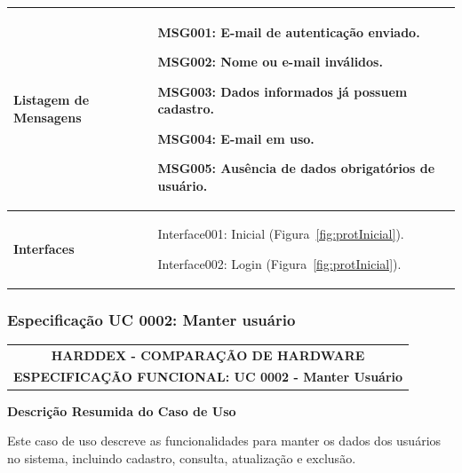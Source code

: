 \begin{quadro}[!htbp]
\begin{tabular}{  m{4cm}  m{11cm} }
        \textbf {Listagem de Mensagens}   & MSG001: E-mail de autenticação enviado.
        
        MSG002: Nome ou e-mail inválidos.

        MSG003: Dados informados já possuem cadastro.

        MSG004: E-mail em uso.
          
        MSG005: Ausência de dados obrigatórios de usuário.  \\ \hline
        
        \cellcolor{gray!10} \textbf {Interfaces}   & \cellcolor{gray!10} Interface001: Inicial (Figura~\ref{fig:protInicial}).
        
        Interface002: Login (Figura~\ref{fig:protInicial}).  \\ \hline 
	\end{tabular}
\end{quadro}




\newpage
\subsubsection {Especificação UC 0002: Manter usuário}

\begin{center}
    \begin{tabular}{  | c |  }
        \hline
             \textbf {HARDDEX - COMPARAÇÃO DE HARDWARE}\\
            \textbf {ESPECIFICAÇÃO FUNCIONAL: UC 0002 - Manter Usuário}\\
        \hline
    \end{tabular}
\end{center}

        \textbf {Descrição Resumida do Caso de Uso} 
        
        Este caso de uso descreve as funcionalidades para manter os dados dos usuários no sistema, incluindo cadastro, consulta, atualização e exclusão.
        
